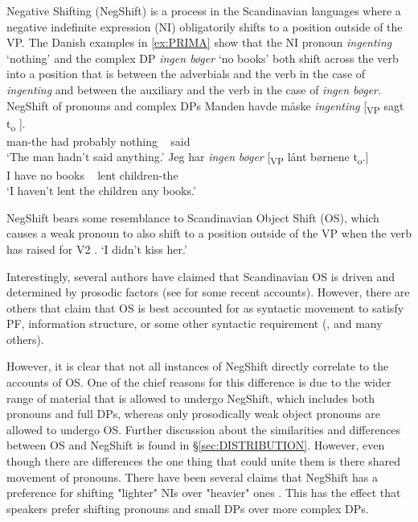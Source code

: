 \documentclass[12pt, letterpaper]{article}
\begin{document}
Negative Shifting (NegShift) is a process in the Scandinavian languages where a negative indefinite expression (NI) obligatorily shifts to a position outside of the VP. The Danish examples in \ref{ex:PRIMA} show that the NI pronoun \textit{ingenting} `nothing' and the complex DP \textit{ingen bøger} `no books' both shift across the verb into a position that is between the adverbials and the verb in the case of \textit{ingenting} and between the auxiliary and the verb in the case of \textit{ingen bøger}.
	\ea NegShift of pronouns and complex DPs\label{ex:PRIMA}
		\ea
		\gll Manden havde måske \textit{ingenting} [\textsubscript{VP} sagt t\textsubscript{o} ].\\
		man-the had probably nothing ~ said\\
		\glt `The man hadn't said anything.'
		\ex 
		\gll Jeg har \textit{ingen} \textit{bøger} [\textsubscript{VP} lånt børnene t\textsubscript{o}.]\\
		I have no books ~ lent children-the\\
		\glt `I haven't lent the children any books.'
		\z
	\z 

NegShift bears some resemblance to Scandinavian Object Shift (OS), which causes a weak pronoun to also shift to a position outside of the VP when the verb has raised for V2 \citep{holmbergWordOrderSyntactic1986,holmbergRemarksHolmbergGeneralization1999}.
	 
	\glt `I didn't kiss her.' \label{ex:OS}  
	\z  

Interestingly, several authors have claimed that Scandinavian OS is driven and determined by prosodic factors (see \cite{erteschik-shirSoundPatternsSyntax2005,erteschik-shirScandinavianObjectShift2017,erteschik-shirVariationMainlandScandinavian2019,brinkerhoffMATCHINGPhrasesNorwegian2020} for some recent accounts). However, there are others that claim that OS is best accounted for as syntactic movement to satisfy PF, information structure, or some other syntactic requirement (\cite{holmbergRemarksHolmbergGeneralization1999,thrainssonObjectShiftScrambling2001,bentzenObjectShiftSpoken2013,sichelFeaturalLifeNominals2020}, and many others). 

However, it is clear that not all instances of NegShift directly correlate to the accounts of OS. One of the chief reasons for this difference is due to the wider range of material that is allowed to undergo NegShift, which includes both pronouns and full DPs, whereas only prosodically weak object pronouns are allowed to undergo OS. Further discussion about the similarities and differences between OS and NegShift is found in §\ref{sec:DISTRIBUTION}. However, even though there are differences the one thing that could unite them is there shared movement of pronouns. There have been several claims that NegShift has a preference for shifting "lighter" NIs over "heavier" ones \citep{christensenInterfacesNegationSyntax2005,penkaNegativeIndefinites2011}. This has the effect that speakers prefer shifting pronouns and small DPs over more complex DPs.
\end{document}
